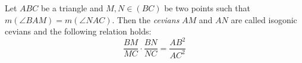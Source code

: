 \documentclass[12pt]{article}
\begin{document}
Let $ABC$ be a triangle and $M,N \in (BC)$ be two points such that
$m(\angle{BAM}) = m(\angle{NAC})$. Then the \emph{cevians} $AM$ and $AN$ are
called isogonic cevians and the following relation holds:
$$ \frac{BM}{MC} \cdot \frac{BN}{NC} = \frac{AB^2}{AC^2}$$
\end{document}
